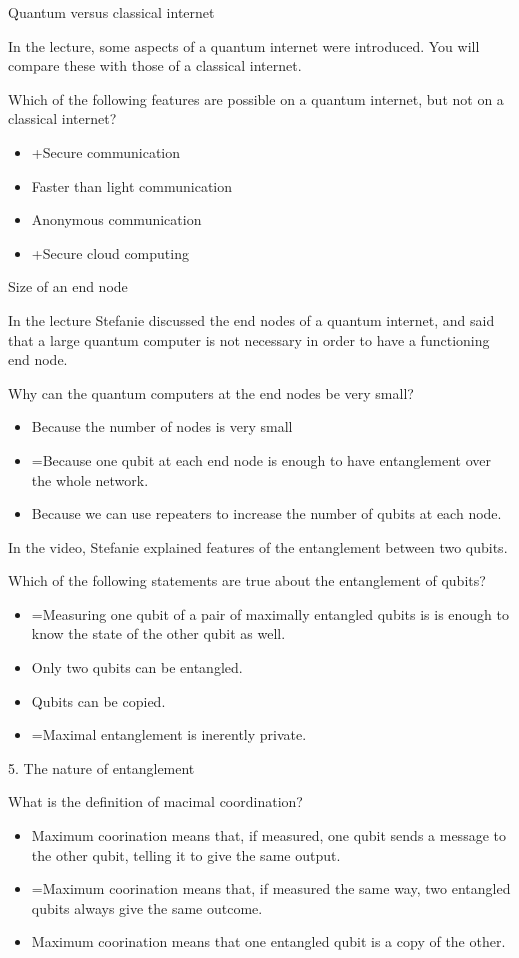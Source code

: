 \documentclass[../../main.tex]{subfiles}
\begin{document}
{Quantum versus classical internet

In the lecture, some aspects of a quantum internet were introduced. You will compare these with those of a classical internet.

Which of the following features are possible on a quantum internet, but not on a classical internet?

\begin{itemize}
\item +Secure communication
\item Faster than light communication
\item Anonymous communication
\item +Secure cloud computing
\end{itemize}

Size of an end node

In the lecture Stefanie discussed the end nodes of a quantum internet, and said that a large quantum computer is not necessary in order to have a functioning end node.

Why can the quantum computers at the end nodes be very small?
\begin{itemize}
\item Because the number of nodes is very small
\item =Because one qubit at each end node is enough to have entanglement over the whole network.
\item Because we can use repeaters to increase the number of qubits at each node.
\end{itemize}

In the video, Stefanie explained features of the entanglement between two qubits.

Which of the following statements are true about the entanglement of qubits?
\begin{itemize}
\item =Measuring one qubit of a pair of maximally entangled qubits is is enough to know the state of the other qubit as well.
\item Only two qubits can be entangled.
\item Qubits can be copied.
\item =Maximal entanglement is inerently private.
\end{itemize}

5. The nature of entanglement

What is the definition of macimal coordination?

\begin{itemize}
\item Maximum coorination means that, if measured, one qubit sends a message to the other qubit, telling it to give the same output.
\item =Maximum coorination means that, if measured the same way, two entangled qubits always give the same outcome.
\item Maximum coorination means that one entangled qubit is a copy of the other.
\end{itemize}

}
\end{document}
